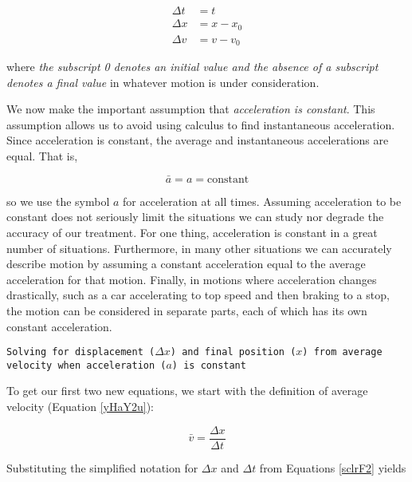 \documentclass[main-ap-physics.tex]{subfiles}
\begin{document}
\begin{align} \label{sclrF2}
    \Delta t &= t\\[0.5ex]
    \Delta x &= x - x_0\\[0.5ex]
    \Delta v &= v - v_0
\end{align}

where \textit{the subscript 0 denotes an initial value and the absence of a subscript denotes a final value} in whatever motion is under consideration.

\vspace{1em}

We now make the important assumption that \textit{acceleration is constant}. This assumption allows us to avoid using calculus to find instantaneous acceleration. Since acceleration is constant, the average and instantaneous accelerations are equal. That is,

\begin{equation}
    \bar{a} = a = \text{constant}
\end{equation}

so we use the symbol $a$ for acceleration at all times. Assuming acceleration to be constant does not seriously limit the situations we can study nor degrade the accuracy of our treatment. For one thing, acceleration is constant in a great number of situations. Furthermore, in many other situations we can accurately describe motion by assuming a constant acceleration equal to the average acceleration for that motion. Finally, in motions where acceleration changes drastically, such as a car accelerating to top speed and then braking to a stop, the motion can be considered in separate parts, each of which has its own constant acceleration.

\vspace{1em}

\cyanhrule

\begin{center}
\texttt{Solving for displacement ($\Delta x$) and final position ($x$) from average velocity when acceleration ($a$) is constant}
\end{center}

To get our first two new equations, we start with the definition of average velocity (Equation \ref{yHaY2u}): 

\begin{equation*}
    \bar{v} = \frac{\Delta x}{\Delta t}
\end{equation*}

Substituting the simplified notation for $\Delta{x}$ and $\Delta{t}$ from Equations \eqref{sclrF2} yields 
\end{document}
